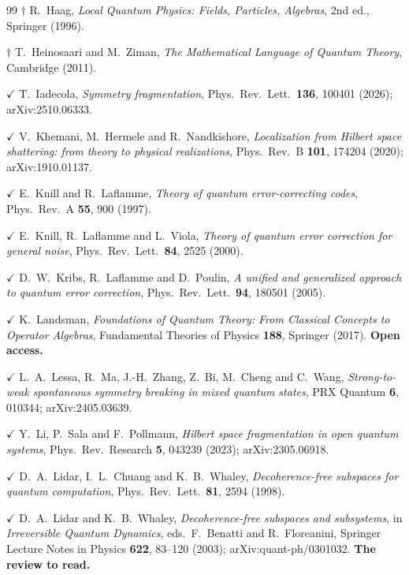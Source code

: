 \documentclass[11pt]{article}
\theoremstyle{plain}
\theoremstyle{remark}
\begin{document}
\begin{thebibliography}{99}
 $\dagger$ R.~Haag,
  \emph{Local Quantum Physics: Fields, Particles, Algebras},
  2nd ed., Springer (1996).

 $\dagger$ T.~Heinosaari and M.~Ziman,
  \emph{The Mathematical Language of Quantum Theory}, Cambridge (2011).

 $\checkmark$ T.~Iadecola,
  \emph{Symmetry fragmentation},
  Phys.\ Rev.\ Lett.\ \textbf{136}, 100401 (2026); arXiv:2510.06333.

 $\checkmark$ V.~Khemani, M.~Hermele and R.~Nandkishore,
  \emph{Localization from Hilbert space shattering: from theory to physical
  realizations},
  Phys.\ Rev.\ B \textbf{101}, 174204 (2020); arXiv:1910.01137.

 $\checkmark$ E.~Knill and R.~Laflamme,
  \emph{Theory of quantum error-correcting codes},
  Phys.\ Rev.\ A \textbf{55}, 900 (1997).

 $\checkmark$ E.~Knill, R.~Laflamme and L.~Viola,
  \emph{Theory of quantum error correction for general noise},
  Phys.\ Rev.\ Lett.\ \textbf{84}, 2525 (2000).

 $\checkmark$ D.~W.~Kribs, R.~Laflamme and D.~Poulin,
  \emph{A unified and generalized approach to quantum error correction},
  Phys.\ Rev.\ Lett.\ \textbf{94}, 180501 (2005).

 $\checkmark$ K.~Landsman,
  \emph{Foundations of Quantum Theory: From Classical Concepts to Operator
  Algebras},
  Fundamental Theories of Physics \textbf{188}, Springer (2017).
  \textbf{Open access.}

 $\checkmark$ L.~A.~Lessa, R.~Ma, J.-H.~Zhang, Z.~Bi,
  M.~Cheng and C.~Wang,
  \emph{Strong-to-weak spontaneous symmetry breaking in mixed quantum states},
  PRX Quantum \textbf{6}, 010344; arXiv:2405.03639.

 $\checkmark$ Y.~Li, P.~Sala and F.~Pollmann,
  \emph{Hilbert space fragmentation in open quantum systems},
  Phys.\ Rev.\ Research \textbf{5}, 043239 (2023); arXiv:2305.06918.

 $\checkmark$ D.~A.~Lidar, I.~L.~Chuang and K.~B.~Whaley,
  \emph{Decoherence-free subspaces for quantum computation},
  Phys.\ Rev.\ Lett.\ \textbf{81}, 2594 (1998).

 $\checkmark$ D.~A.~Lidar and K.~B.~Whaley,
  \emph{Decoherence-free subspaces and subsystems}, in
  \emph{Irreversible Quantum Dynamics}, eds.\ F.~Benatti and R.~Floreanini,
  Springer Lecture Notes in Physics \textbf{622}, 83--120 (2003);
  arXiv:quant-ph/0301032. \textbf{The review to read.}


\end{thebibliography}
\end{document}
